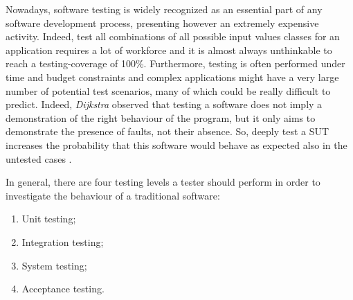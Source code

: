 Nowadays, software testing is widely recognized as an essential part of any software development process, presenting however an extremely expensive activity. Indeed, test all combinations of all possible input values classes for an application \cite{glinz} requires a lot of workforce and it is almost always unthinkable to reach a testing-coverage of 100\%. 
Furthermore, testing is often performed under time and budget constraints \cite{grano} and complex applications might have a very large number of potential test scenarios, many of which could be really difficult to predict. Indeed, \textit{Dijkstra} \cite{dijkstra} observed that testing a software does not imply a demonstration of the right behaviour of the program, but it only aims to demonstrate the presence of faults, not their absence. 
So, deeply test a SUT increases the probability that this software would behave as expected also in the untested cases \cite{glinz}. 

In general, there are four testing levels a tester should perform in order to investigate the behaviour of a traditional software: 
\begin{enumerate}
\item Unit testing; 
\item Integration testing; 
\item System testing; 
\item Acceptance testing.
\end{enumerate}

